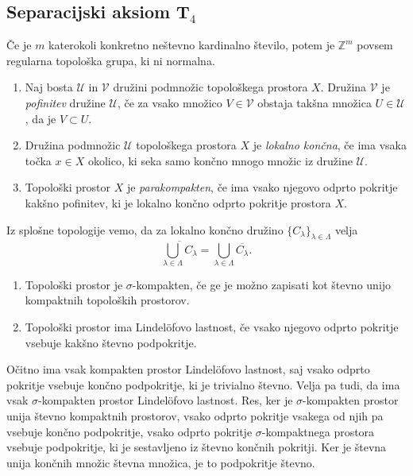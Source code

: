 \documentclass[mat1]{fmfdelo}
\newcommand{\Z}{\mathbb Z}
\newcommand{\closure}[1]{\overline{#1}}
\begin{document}
\subsection{Separacijski aksiom T$_4$}
\begin{izrek}\label{izr:t4protiprimer}
	Če je $m$ katerokoli konkretno neštevno kardinalno število, potem je $\Z^{m}$ povsem regularna topološka grupa, ki ni normalna.
\end{izrek}

\begin{definicija}\label{def:parakompakt}
	\begin{enumerate}
		\item Naj bosta $\mathcal{U}$ in $\mathcal{V}$ družini podmnožic topološkega prostora $X$. Družina $\mathcal{V}$ je \emph{pofinitev} družine $\mathcal{U}$, če za vsako množico $V \in \mathcal{V}$ obstaja takšna množica $U \in \mathcal{U}$, da je $V \subset U$.
		\item Družina podmnožic $\mathcal{U}$ topološkega prostora $X$ je \emph{lokalno končna}, če ima vsaka točka $x \in X$ okolico, ki seka samo končno mnogo množic iz družine $\mathcal{U}$.
		\item Topološki prostor $X$ je \emph{parakompakten}, če ima vsako njegovo odprto pokritje kakšno pofinitev, ki je lokalno končno odprto pokritje prostora $X$.
	\end{enumerate}
\end{definicija}

\begin{opomba}\label{opo:lokkon} %
Iz splošne topologije vemo, da za lokalno končno družino $\lbrace C_\lambda \rbrace_{\lambda \in \Lambda}$ velja
\[ \closure{\bigcup_{\lambda \in \Lambda} C_\lambda} = \bigcup_{\lambda \in \Lambda} \closure{C_\lambda}. \]
\end{opomba}

\begin{definicija}
\begin{enumerate}
\item Topološki prostor je $\sigma$-kompakten, če ge je možno zapisati kot števno unijo kompaktnih topoloških prostorov.
\item Topološki prostor ima Lindel\"ofovo lastnost, če vsako njegovo odprto pokritje vsebuje kakšno števno podpokritje.
\end{enumerate}
\end{definicija}

Očitno ima vsak kompakten prostor Lindel\"ofovo lastnost, saj vsako odprto pokritje vsebuje končno podpokritje, ki je trivialno števno. Velja pa tudi, da ima vsak $\sigma$-kompakten prostor Lindel\"ofovo lastnost. Res, ker je $\sigma$-kompakten prostor unija števno kompaktnih prostorov, vsako odprto pokritje vsakega od njih pa vsebuje končno podpokritje, vsako odprto pokritje $\sigma$-kompaktnega prostora vsebuje pod\-pok\-rit\-je, ki je sestavljeno iz števno končnih pokritji. Ker je števna unija končnih množic števna množica, je to podpokritje števno.
\end{document}

